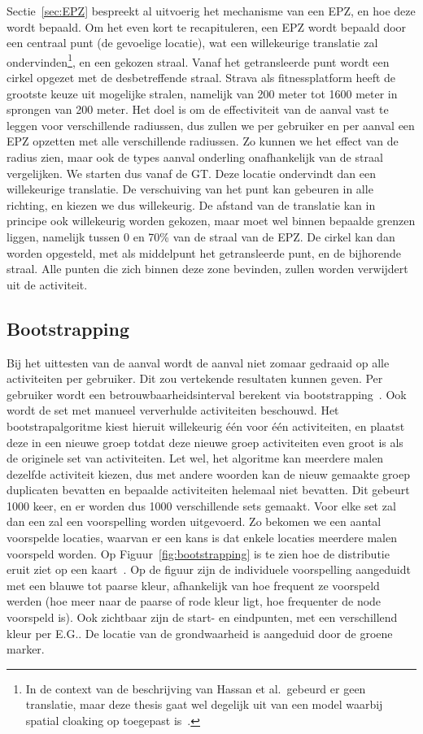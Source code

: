 Sectie~\ref{sec:EPZ} bespreekt al uitvoerig het mechanisme van een \ac{EPZ}, en
hoe deze wordt bepaald. Om het even kort te recapituleren, een \ac{EPZ} wordt
bepaald door een centraal punt (de gevoelige locatie), wat een willekeurige
translatie zal ondervinden\footnote{In de context van de beschrijving van
    Hassan et al.\ gebeurd er geen translatie, maar deze thesis gaat wel degelijk
    uit van een model waarbij spatial cloaking op toegepast
    is~\cite{sec18has3:online}.}, en een gekozen straal. Vanaf het getransleerde
punt wordt een cirkel opgezet met de desbetreffende straal. Strava als
fitnessplatform heeft de grootste keuze uit mogelijke stralen, namelijk van 200
meter tot 1600 meter in sprongen van 200 meter. Het doel is om de effectiviteit
van de aanval vast te leggen voor verschillende radiussen, dus zullen we per
gebruiker en per aanval een \ac{EPZ} opzetten met alle verschillende radiussen.
Zo kunnen we het effect van de radius zien, maar ook de types aanval onderling
onafhankelijk van de straal vergelijken. We starten dus vanaf de \ac{GT}. Deze
locatie ondervindt dan een willekeurige translatie. De verschuiving van het
punt kan gebeuren in alle richting, en kiezen we dus willekeurig. De afstand
van de translatie kan in principe ook willekeurig worden gekozen, maar moet wel
binnen bepaalde grenzen liggen, namelijk tussen 0 en 70\% van de straal van de
\ac{EPZ}. De cirkel kan dan worden opgesteld, met als middelpunt het
getransleerde punt, en de bijhorende straal. Alle punten die zich binnen deze
zone bevinden, zullen worden verwijdert uit de activiteit.

\subsection{Bootstrapping}
Bij het uittesten van de aanval wordt de aanval niet zomaar gedraaid op alle
activiteiten per gebruiker. Dit zou vertekende resultaten kunnen geven. Per
gebruiker wordt een betrouwbaarheidsinterval berekent via
bootstrapping~\cite{Dhondt, Verdonck_2022}. Ook wordt de set met manueel
ververhulde activiteiten beschouwd. Het bootstrapalgoritme kiest hieruit
willekeurig één voor één activiteiten, en plaatst deze in een nieuwe groep
totdat deze nieuwe groep activiteiten even groot is als de originele set van
activiteiten. Let wel, het algoritme kan meerdere malen dezelfde activiteit
kiezen, dus met andere woorden kan de nieuw gemaakte groep duplicaten bevatten
en bepaalde activiteiten helemaal niet bevatten. Dit gebeurt 1000 keer, en er
worden dus 1000 verschillende sets gemaakt. Voor elke set zal dan een zal een
voorspelling worden uitgevoerd. Zo bekomen we een aantal voorspelde locaties,
waarvan er een kans is dat enkele locaties meerdere malen voorspeld worden. Op
Figuur~\ref{fig:bootstrapping} is te zien hoe de distributie eruit ziet op een
kaart~\cite{Verdonck_2022}. Op de figuur zijn de individuele voorspelling
aangeduidt met een blauwe tot paarse kleur, afhankelijk van hoe frequent ze
voorspeld werden (hoe meer naar de paarse of rode kleur ligt, hoe frequenter de
node voorspeld is). Ook zichtbaar zijn de start- en eindpunten, met een
verschillend kleur per \ac{E.G.}. De locatie van de grondwaarheid is aangeduid
door de groene marker.

